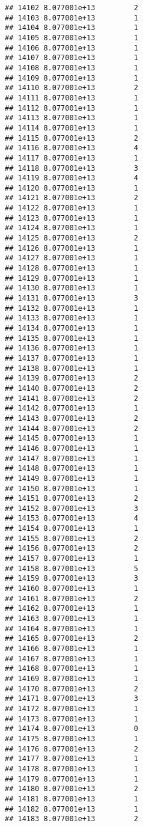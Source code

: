 \documentclass[
]{article}
\begin{document}
\begin{verbatim}
## 14102 8.077001e+13         2
## 14103 8.077001e+13         1
## 14104 8.077001e+13         1
## 14105 8.077001e+13         1
## 14106 8.077001e+13         1
## 14107 8.077001e+13         1
## 14108 8.077001e+13         1
## 14109 8.077001e+13         1
## 14110 8.077001e+13         2
## 14111 8.077001e+13         1
## 14112 8.077001e+13         1
## 14113 8.077001e+13         1
## 14114 8.077001e+13         1
## 14115 8.077001e+13         2
## 14116 8.077001e+13         4
## 14117 8.077001e+13         1
## 14118 8.077001e+13         3
## 14119 8.077001e+13         4
## 14120 8.077001e+13         1
## 14121 8.077001e+13         2
## 14122 8.077001e+13         1
## 14123 8.077001e+13         1
## 14124 8.077001e+13         1
## 14125 8.077001e+13         2
## 14126 8.077001e+13         1
## 14127 8.077001e+13         1
## 14128 8.077001e+13         1
## 14129 8.077001e+13         1
## 14130 8.077001e+13         1
## 14131 8.077001e+13         3
## 14132 8.077001e+13         1
## 14133 8.077001e+13         1
## 14134 8.077001e+13         1
## 14135 8.077001e+13         1
## 14136 8.077001e+13         1
## 14137 8.077001e+13         1
## 14138 8.077001e+13         1
## 14139 8.077001e+13         2
## 14140 8.077001e+13         2
## 14141 8.077001e+13         2
## 14142 8.077001e+13         1
## 14143 8.077001e+13         2
## 14144 8.077001e+13         2
## 14145 8.077001e+13         1
## 14146 8.077001e+13         1
## 14147 8.077001e+13         1
## 14148 8.077001e+13         1
## 14149 8.077001e+13         1
## 14150 8.077001e+13         1
## 14151 8.077001e+13         2
## 14152 8.077001e+13         3
## 14153 8.077001e+13         4
## 14154 8.077001e+13         1
## 14155 8.077001e+13         2
## 14156 8.077001e+13         2
## 14157 8.077001e+13         1
## 14158 8.077001e+13         5
## 14159 8.077001e+13         3
## 14160 8.077001e+13         1
## 14161 8.077001e+13         2
## 14162 8.077001e+13         1
## 14163 8.077001e+13         1
## 14164 8.077001e+13         1
## 14165 8.077001e+13         2
## 14166 8.077001e+13         1
## 14167 8.077001e+13         1
## 14168 8.077001e+13         1
## 14169 8.077001e+13         1
## 14170 8.077001e+13         2
## 14171 8.077001e+13         3
## 14172 8.077001e+13         1
## 14173 8.077001e+13         1
## 14174 8.077001e+13         0
## 14175 8.077001e+13         1
## 14176 8.077001e+13         2
## 14177 8.077001e+13         1
## 14178 8.077001e+13         1
## 14179 8.077001e+13         1
## 14180 8.077001e+13         2
## 14181 8.077001e+13         1
## 14182 8.077001e+13         1
## 14183 8.077001e+13         2

\end{verbatim}
\end{document}
